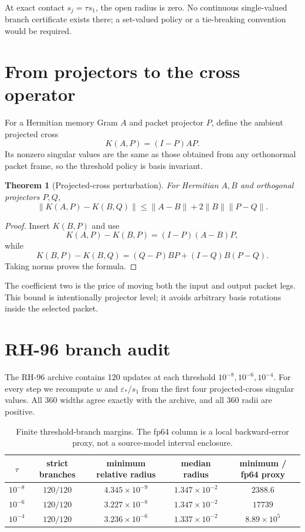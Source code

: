 \documentclass[12pt]{article}
\newtheorem{theorem}{Theorem}
\begin{document}
At exact contact $s_j=\tau s_1$, the open radius is zero.  No continuous
single-valued branch certificate exists there; a set-valued policy or a
tie-breaking convention would be required.

\section{From projectors to the cross operator}
For a Hermitian memory Gram $A$ and packet projector $P$, define the ambient
projected cross
\[
 K(A,P)=(I-P)AP.
\]
Its nonzero singular values are the same as those obtained from any
orthonormal packet frame, so the threshold policy is basis invariant.

\begin{theorem}[Projected-cross perturbation]\label{thm:cross}
For Hermitian $A,B$ and orthogonal projectors $P,Q$,
\[
 \|K(A,P)-K(B,Q)\|
 \leq\|A-B\|+2\|B\|\|P-Q\|.
\]
\end{theorem}
\begin{proof}
Insert $K(B,P)$ and use
\[
 K(A,P)-K(B,P)=(I-P)(A-B)P,
\]
while
\[
 K(B,P)-K(B,Q)=(Q-P)BP+(I-Q)B(P-Q).
\]
Taking norms proves the formula.
\end{proof}

The coefficient two is the price of moving both the input and output packet
legs.  This bound is intentionally projector level; it avoids arbitrary
basis rotations inside the selected packet.

\section{RH-96 branch audit}
The RH-96 archive contains 120 updates at each threshold
$10^{-8},10^{-6},10^{-4}$.  For every step we recompute $w$ and
$\varepsilon_*/s_1$ from the first four projected-cross singular values.
All 360 widths agree exactly with the archive, and all 360 radii are positive.

\begin{table}[t]
\centering
\scriptsize
\begin{tabular}{ccccc}
\toprule
$\tau$ & strict branches & minimum relative radius & median radius & minimum / fp64 proxy\\
\midrule
$10^{-8}$ & $120/120$ & $4.345\times10^{-9}$ & $1.347\times10^{-2}$ & $2388.6$\\
$10^{-6}$ & $120/120$ & $3.227\times10^{-8}$ & $1.347\times10^{-2}$ & $17739$\\
$10^{-4}$ & $120/120$ & $3.236\times10^{-6}$ & $1.337\times10^{-2}$ & $8.89\times10^5$\\
\bottomrule
\end{tabular}
\caption{Finite threshold-branch margins.  The fp64 column is a local
backward-error proxy, not a source-model interval enclosure.}
\label{tab:audit}
\end{table}
\end{document}
